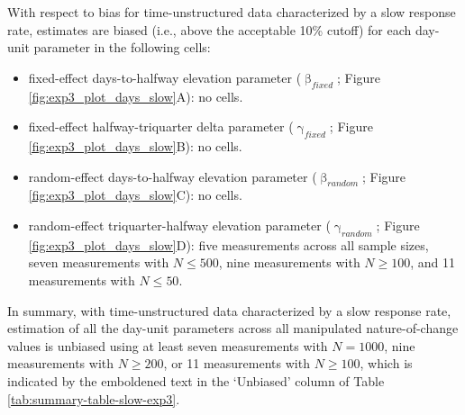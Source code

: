 \documentclass[
12pt, %
twoside,
english]{guelphthesis}
\theoremstyle{definition}
\theoremstyle{definition}
\theoremstyle{definition}
\theoremstyle{definition}
\theoremstyle{remark}
\begin{document}
With respect to bias for time-unstructured data characterized by a slow response rate, estimates are biased (i.e., above the acceptable 10\% cutoff) for each day-unit parameter in the following cells:
\begin{itemize}
\tightlist
\item
  fixed-effect days-to-halfway elevation parameter (\(\upbeta_{fixed}\); Figure \ref{fig:exp3_plot_days_slow}A): no cells.
\item
  fixed-effect halfway-triquarter delta parameter (\(\upgamma_{fixed}\); Figure \ref{fig:exp3_plot_days_slow}B): no cells.
\item
  random-effect days-to-halfway elevation parameter (\(\upbeta_{random}\); Figure \ref{fig:exp3_plot_days_slow}C): no cells.
\item
  random-effect triquarter-halfway elevation parameter (\(\upgamma_{random}\); Figure \ref{fig:exp3_plot_days_slow}D): five measurements across all sample sizes, seven measurements with \(N \le 500\), nine measurements with \(N \ge 100\), and 11 measurements with \(N \le 50\).
\end{itemize}
In summary, with time-unstructured data characterized by a slow response rate, estimation of all the day-unit parameters across all manipulated nature-of-change values is unbiased using at least seven measurements with \(N = 1000\), nine measurements with \(N \ge 200\), or 11 measurements with \(N \ge 100\), which is indicated by the emboldened text in the `Unbiased' column of Table \ref{tab:summary-table-slow-exp3}.
\end{document}
